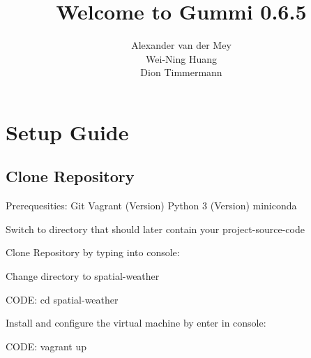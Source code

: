 \documentclass[11pt]{article}
\title{\textbf{Welcome to Gummi 0.6.5}}
\author{Alexander van der Mey\\
		Wei-Ning Huang\\
		Dion Timmermann}
\date{}
\begin{document}
\maketitle

\section{Setup Guide}
\subsection{Clone Repository}

Prerequesities:
Git
Vagrant (Version)
Python 3 (Version)
miniconda

Switch to directory that should later contain your project-source-code

Clone Repository by typing into console:

Change directory to spatial-weather

CODE: cd spatial-weather

Install and configure the virtual machine by enter in console:

CODE: vagrant up
\end{document}
